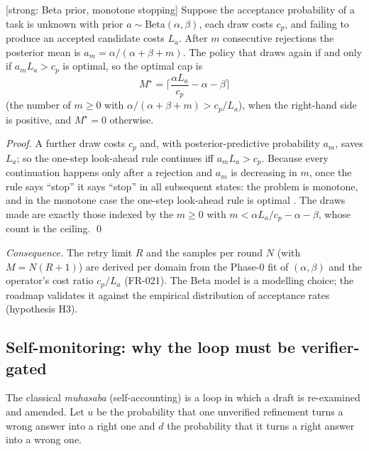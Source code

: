 \begin{proposition}
\textnormal{[strong: Beta prior, monotone stopping]}
\label{prop:stopping}
Suppose the acceptance probability of a task is unknown with prior
$a\sim\mathrm{Beta}(\alpha,\beta)$, each draw costs $c_p$, and failing to
produce an accepted candidate costs $L_a$. After $m$ consecutive rejections the
posterior mean is $a_m=\alpha/(\alpha+\beta+m)$. The policy that draws again if
and only if $a_m L_a>c_p$ is optimal, so the optimal cap is
\begin{equation}
M^\star=\Big\lceil\frac{\alpha L_a}{c_p}-\alpha-\beta\Big\rceil
\end{equation}
(the number of $m\ge0$ with $\alpha/(\alpha+\beta+m)>c_p/L_a$),
when the right-hand side is positive, and $M^\star=0$ otherwise.
\end{proposition}
\begin{proof}
A further draw costs $c_p$ and, with posterior-predictive probability $a_m$,
saves $L_a$; so the one-step look-ahead rule continues iff $a_mL_a>c_p$.
Because every continuation happens only after a rejection and $a_m$ is
decreasing in $m$, once the rule says ``stop'' it says ``stop'' in all
subsequent states: the problem is monotone, and in the monotone case the
one-step look-ahead rule is optimal \cite{chow1971great}. The draws made are exactly those indexed by the $m\ge0$ with
$m<\alpha L_a/c_p-\alpha-\beta$, whose count is the ceiling. \qed
\end{proof}
\emph{Consequence.} The retry limit $R$ and the samples per round $N$
(with $M=N(R{+}1)$) are derived per domain from the Phase-0 fit of
$(\alpha,\beta)$ and the operator's cost ratio $c_p/L_a$ (FR-021). The Beta
model is a modelling choice; the roadmap validates it against the empirical
distribution of acceptance rates (hypothesis H3).

\subsection{Self-monitoring: why the loop must be verifier-gated}

The classical \emph{muhasaba} (self-accounting) is a loop in which a draft is
re-examined and amended. Let $u$ be the probability that one unverified
refinement turns a wrong answer into a right one and $d$ the probability that
it turns a right answer into a wrong one.

